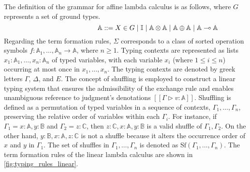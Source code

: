The definition of the grammar for affine lambda calculus is as follows, where $G$ represents a set of ground types.
\begin{equation} \label{eq:grammar}
\centering
\hspace{95pt} \mathbb{A} ::= X \in G \hspace{3 pt} \vert \hspace{3 pt} \mathbb{I}  \hspace{3 pt}  \vert \hspace{3 pt} \mathbb{A}  \otimes  \mathbb{A} \hspace{3 pt} \vert \hspace{3 pt} \mathbb{A} \oplus \mathbb{A} \hspace{3 pt}  \vert \hspace{3 pt}   \mathbb{A} \multimap  \mathbb{A}
\end{equation}
 Regarding the term formation rules, $\Sigma$ corresponds to a class of sorted operation symbols $f: \mathbb{A}_{1}, \ldots, \mathbb{A}_{n} \xrightarrow{} \mathbb{A}$, where $n \geq 1$.   Typing contexts are represented as lists $x_{1}: \mathbb{A}_{1}, \ldots, x_{n}: \mathbb{A}_{n}$ of typed variables, with each variable $x_i$ (where $1 \leq i \leq n$) occurring at most once in $x_1, \ldots, x_n$. The typing contexts are denoted by greek letters $\Gamma$, $\Delta$, and $E$.
The concept of shuffling is employed to construct a linear typing system that ensures the admissibility of the exchange rule and enables unambiguous reference to judgment's denotations $[\![ \Gamma \triangleright v: \mathbb{A} ]\!]$. Shuffling is defined as a permutation of typed variables in a sequence of contexts, $\Gamma_1, \ldots, \Gamma_n$, preserving the relative order of variables within each $\Gamma_i$. For instance, if $\Gamma_1=x:\mathbb{A}, y:\mathbb{B}$ and $\Gamma_2=z:\mathbb{C}$, then $z:\mathbb{C}, x:\mathbb{A}, y:\mathbb{B}$ is a valid shuffle of $\Gamma_1, \Gamma_2$. On the other hand, $y:\mathbb{B}, x:\mathbb{A}, z:\mathbb{C}$ is not a shuffle because it alters the occurrence order of $x$ and $y$ in $\Gamma_1$. The set of shuffles in $\Gamma_1, \ldots, \Gamma_n$ is denoted as $\text{Sf} (\Gamma_1, \ldots, \Gamma_n)$.
The term formation rules of the linear lambda calculus are shown in
\autoref{fig:typing_rules_linear}.
\vspace{-10pt}
